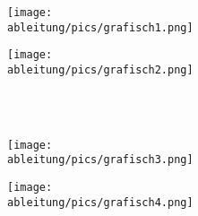 \newpage
\begin{minipage}{\textwidth}
	\begin{Exercise}[title={\raggedright Schätze jeweils die Ableitung an den Stellen -2, 0, 1 und 3 ab.}, label=grafischABlA1]
		\begin{minipage}{\textwidth}
			\begin{minipage}{0.49\textwidth}
				\centering\texttt{[image: \\ableitung/pics/grafisch1.png]}
			\end{minipage}
			\begin{minipage}{0.49\textwidth}
				\centering\texttt{[image: \\ableitung/pics/grafisch2.png]}
			\end{minipage}
		\end{minipage}\\\phantom{x}\\
		\begin{minipage}{\textwidth}
			\begin{minipage}{0.49\textwidth}
				\centering\texttt{[image: \\ableitung/pics/grafisch3.png]}
			\end{minipage}
			\begin{minipage}{0.49\textwidth}
				\centering\texttt{[image: \\ableitung/pics/grafisch4.png]}
			\end{minipage}\\
		\end{minipage}
	\end{Exercise}
\end{minipage}

